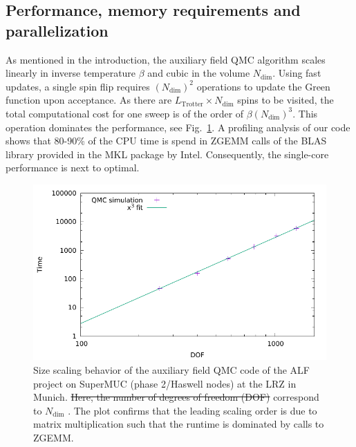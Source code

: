 \subsection{Performance, memory requirements and parallelization}


As mentioned in the  introduction, the auxiliary field QMC algorithm scales linearly in inverse temperature $\beta$ and cubic in the volume $N_{\text{dim}}$. Using fast updates,  a single spin flip  requires $(N_{\text{dim}})^2$ operations to update the Green function upon acceptance.  As there are $L_{\text{Trotter}}\times N_{\text{dim}}$ spins to be visited, the total computational cost for one sweep is of the order of $\beta (N_{\text{dim}})^3$. This operation  dominates the performance, see Fig.~\ref{fig_scaling_size}. A profiling analysis of our code shows that 80-90\% of the CPU time is spend in ZGEMM calls of the BLAS library provided in the MKL package by Intel. Consequently, the single-core performance is next to optimal.

\begin{figure}[h]
	\begin{center}
		\includegraphics[scale=.8]{Figures/Size_scaling_ALF.pdf}
	\end{center}
	\caption{\label{fig_scaling_size}Size scaling behavior of the auxiliary field QMC code of the ALF project on SuperMUC (phase 2/Haswell nodes) at the LRZ in Munich. \st{Here, the number of  degrees of freedom (DOF)}  correspond to   $N_{\text{dim}}$ .    The plot confirms that the leading scaling order is due to matrix multiplication such that the runtime is dominated by calls to ZGEMM. }
\end{figure}

